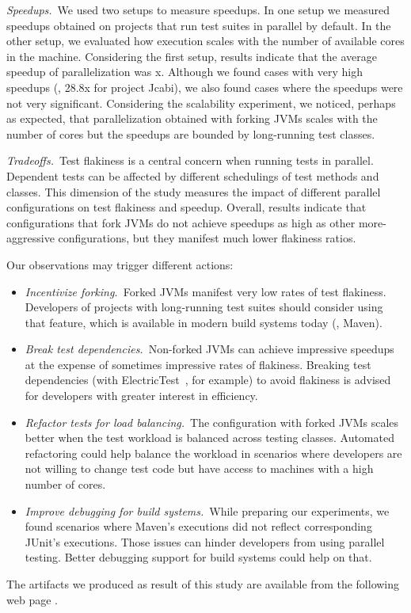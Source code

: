 \noindent\emph{Speedups.}~We used two setups to measure speedups.  In one setup
we measured speedups obtained on projects that run test suites in parallel by
default.  In the other setup, we evaluated how execution scales with the number
of available cores in the machine.  Considering the first
setup, results indicate that the average speedup of parallelization was
\avgSpeedup{}x.  Although we found cases with very high speedups (\eg{}, 28.8x
for project Jcabi), we also found cases where the speedups were not very
significant.  Considering the scalability experiment, we noticed, perhaps as
expected, that parallelization obtained with forking JVMs scales with the number
of cores but the speedups are bounded by long-running test classes.

\noindent\emph{Tradeoffs.}~Test flakiness is a central concern when running
tests in parallel.  Dependent tests can be affected by different schedulings of
test methods and classes.  This dimension of the study measures the impact of
different parallel configurations on test flakiness and speedup.  Overall,
results indicate that configurations that fork JVMs do not achieve speedups as
high as other more-aggressive configurations, but they manifest much lower
flakiness ratios.

Our observations may trigger different actions:

\begin{itemize}
\item \emph{Incentivize forking.}~Forked JVMs manifest very low rates
  of test flakiness.  Developers of projects with long-running test
  suites should consider using that feature, which is available in
  modern build systems today (\eg{}, Maven).
\item \emph{Break test dependencies.}~Non-forked JVMs can achieve
  impressive speedups at the expense of sometimes impressive rates of
  flakiness.  Breaking test dependencies (with
  ElectricTest~\citet{bell-etal-esecfse2015}, for example) to avoid flakiness is advised for developers with
  greater interest in efficiency.
\item \emph{Refactor tests for load balancing.}~The configuration with
  forked JVMs scales
  better when the test workload is balanced
  across testing classes.  Automated refactoring could help balance
  the workload in scenarios where developers are not willing to change
  test code but have access to machines with a high number of cores.
\item \emph{Improve debugging for build systems.}~While preparing our
  experiments, we found scenarios where Maven's executions did not reflect
  corresponding JUnit's executions. Those issues can hinder developers from using parallel
  testing. Better debugging support for build systems could help
  on that. 
\end{itemize}

The artifacts we produced as result of this study are available from
the following web page \webpage{}.


